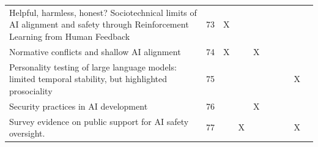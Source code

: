 \begin{landscape}
\begin{longtable}{|p{17cm}|c|c|c|c|c|c|c|c|c|}
		Helpful, harmless, honest? Sociotechnical limits of AI alignment and safety through Reinforcement Learning from Human Feedback                          & 73          & X                                  &                                                           &                                                       &                                                            &                                           &                                              &                                                    &                                    \\
		Normative conflicts and shallow AI alignment                                                                                                            & 74          & X                                  &                                                           & X                                                     &                                                            &                                           &                                              &                                                    &                                    \\
		Personality testing of large language models: limited temporal stability, but highlighted prosociality                                                  & 75          &                                    &                                                           &                                                       &                                                            &                                           &                                              & X                                                  &                                    \\
		Security practices in AI development                                                                                                                    & 76          &                                    &                                                           & X                                                     &                                                            &                                           &                                              &                                                    &                                    \\
		Survey evidence on public support for AI safety oversight.                                                                                              & 77          &                                    & X                                                         &                                                       &                                                            &                                           &                                              & X                                                  &                                    \\

\end{longtable}
\end{landscape}
